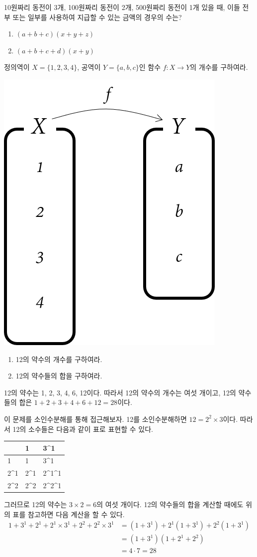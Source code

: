 \documentclass{oblivoir}
\begin{document}
%
\prob{}\label{law8}
10원짜리 동전이 3개, 100원짜리 동전이 2개, 500원짜리 동전이 1개 있을 때, 이들 전부 또는 일부를 사용하여 지급할 수 있는 금액의 경우의 수는?

%
\begin{enumerate}\label{law9}
\item
\((a+b+c)(x+y+z)\)
\item
\((a+b+c+d)(x+y)\)
\end{enumerate}

%
\prob{}\label{law10}
정의역이 \(X=\{1,2,3,4\}\), 공역이 \(Y=\{a,b,c\}\)인 함수 \(f:X\to Y\)의 개수를 구하여라.
\begin{center}
\includegraphics[width=.2\textwidth]{law_10}
\end{center}

\newpage
%
\exam{}
\begin{enumerate}\label{law11}
\item
12의 약수의 개수를 구하여라.
\item
12의 약수들의 합을 구하여라.
\end{enumerate}
\begin{mdframed}
12의 약수는 1, 2, 3, 4, 6, 12이다.
따라서 12의 약수의 개수는 여섯 개이고, 12의 약수들의 합은 \(1+2+3+4+6+12=28\)이다.
\end{mdframed}

이 문제를 소인수분해를 통해 접근해보자.
12를 소인수분해하면 \(12=2^2\times3\)이다.
따라서 12의 소수들은 다음과 같이 표로 표현할 수 있다.
\begin{center}
\begin{tabu}to.4\textwidth{X[c,$]|X[c,$]X[c,$]}
\times	&1	&3^1\\		&1	&3^1\\
2^1		&2^1	&2^1^1\\
2^2		&2^2	&2^2^1
\end{tabu}
\end{center}
%
그러므로 12의 약수는 \(3\times2=6\)의 여섯 개이다.
12의 약수들의 합을 계산할 때에도 위의 표를 참고하면 다음 계산을 할 수 있다.
\begin{align*}
1+3^1+2^1+2^1\times3^1+2^2+2^2\times3^1
&=(1+3^1)+2^1(1+3^1)+2^2(1+3^1)\\
&=(1+3^1)(1+2^1+2^2)\\
&=4\cdot7=28
\end{align*}
\end{document}
